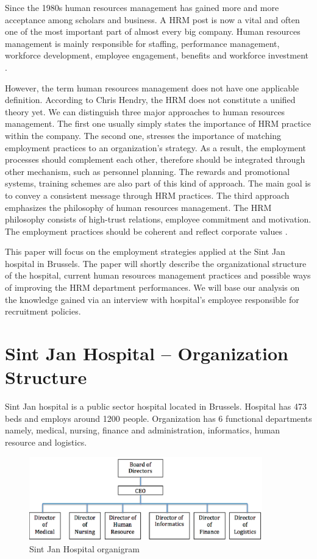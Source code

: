 \documentclass[a4paper,fleqn,11pt,dvips,titlepage]{article}
\numberwithin{figure}{section}
\numberwithin{equation}{section}
\begin{document}
Since the 1980s human resources management has gained more and more acceptance among scholars and business.
A HRM post is now a vital and often one of the most important part of almost every big company.
Human resources management is mainly responsible for staffing, performance management, workforce development, employee engagement, benefits and workforce investment \cite{Packard}. 

However, the term human resources management does not have one applicable definition.
According to Chris Hendry, the HRM does not constitute a unified theory yet.
We can distinguish three major approaches to human resources management.
The first one usually simply states the importance of HRM practice within the company.
The second one, stresses the importance of matching employment practices to an organization’s strategy.
As a result, the employment processes should complement each other, therefore should be integrated through other mechanism, such as personnel planning.
The rewards and promotional systems, training schemes are also part of this kind of approach.
The main goal is to convey a consistent message through HRM practices.
The third approach emphasizes the philosophy of human resources management.
The HRM philosophy consists of high-trust relations, employee commitment and motivation.
The employment practices should be coherent and reflect corporate values \cite{hendry1995human}.

This paper will focus on the employment strategies applied at the Sint Jan hospital in Brussels.
The paper will shortly describe the organizational structure of the hospital, current human resources management practices and possible ways of improving the HRM department performances.
We will base our analysis on the knowledge gained via an interview with hospital’s employee responsible for recruitment policies. 


\section{Sint Jan Hospital – Organization Structure}

Sint Jan hospital is a public sector hospital located in Brussels.
Hospital has 473 beds and employs around 1200 people.
Organization has 6 functional departments namely, medical, nursing, finance and administration, informatics, human resource and logistics. 
\begin{figure}[ht]
  \begin{center}
    \includegraphics[width=0.9\textwidth]{organigram.eps}
  \end{center}
  \caption{Sint Jan Hospital organigram}
  \label{fig:organigram}
\end{figure}
\end{document}
